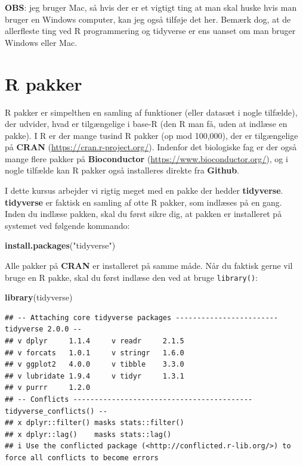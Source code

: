 \documentclass[
]{book}
\newenvironment{Shaded}{\begin{snugshade}}{\end{snugshade}}
\newcommand{\FunctionTok}[1]{\textcolor[rgb]{0.13,0.29,0.53}{\textbf{#1}}}
\newcommand{\NormalTok}[1]{#1}
\newcommand{\StringTok}[1]{\textcolor[rgb]{0.31,0.60,0.02}{#1}}
\theoremstyle{definition}
\theoremstyle{definition}
\theoremstyle{definition}
\theoremstyle{definition}
\theoremstyle{remark}
\begin{document}
\textbf{OBS}: jeg bruger Mac, så hvis der er et vigtigt ting at man skal huske hvis man bruger en Windows computer, kan jeg også tilføje det her. Bemærk dog, at de allerfleste ting ved R programmering og tidyverse er ens uanset om man bruger Windows eller Mac.

\section{R pakker}\label{r-pakker}

R pakker er simpelthen en samling af funktioner (eller datasæt i nogle tilfælde), der udvider, hvad er tilgængelige i base-R (den R man få, uden at indlæse en pakke). I R er der mange tusind R pakker (op mod 100,000), der er tilgængelige på \textbf{CRAN} (\url{https://cran.r-project.org/}). Indenfor det biologiske fag er der også mange flere pakker på \textbf{Bioconductor} (\url{https://www.bioconductor.org/}), og i nogle tilfælde kan R pakker også installeres direkte fra \textbf{Github}.

I dette kursus arbejder vi rigtig meget med en pakke der hedder \textbf{tidyverse}. \textbf{tidyverse} er faktisk en samling af otte R pakker, som indlæses på en gang. Inden du indlæse pakken, skal du først sikre dig, at pakken er installeret på systemet ved følgende kommando:

\begin{Shaded}
\begin{Highlighting}[]
\FunctionTok{install.packages}\NormalTok{(}\StringTok{"tidyverse"}\NormalTok{)}
\end{Highlighting}
\end{Shaded}

Alle pakker på \textbf{CRAN} er installeret på samme måde. Når du faktisk gerne vil bruge en R pakke, skal du først indlæse den ved at bruge \texttt{library()}:

\begin{Shaded}
\begin{Highlighting}[]
\FunctionTok{library}\NormalTok{(tidyverse)}
\end{Highlighting}
\end{Shaded}

\begin{verbatim}
## -- Attaching core tidyverse packages ------------------------ tidyverse 2.0.0 --
## v dplyr     1.1.4     v readr     2.1.5
## v forcats   1.0.1     v stringr   1.6.0
## v ggplot2   4.0.0     v tibble    3.3.0
## v lubridate 1.9.4     v tidyr     1.3.1
## v purrr     1.2.0     
## -- Conflicts ------------------------------------------ tidyverse_conflicts() --
## x dplyr::filter() masks stats::filter()
## x dplyr::lag()    masks stats::lag()
## i Use the conflicted package (<http://conflicted.r-lib.org/>) to force all conflicts to become errors
\end{verbatim}
\end{document}
